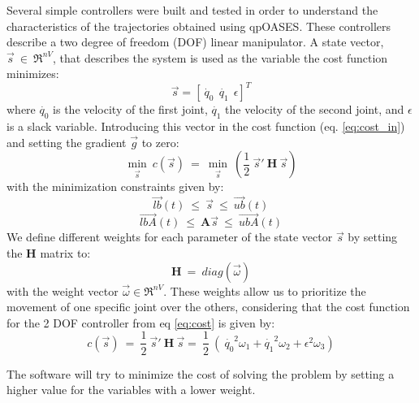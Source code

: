 Several simple controllers were built and tested in order to understand the characteristics of the trajectories obtained using qpOASES. These controllers describe a two degree of freedom (DOF) linear manipulator. A state vector, $\vec{s}\ \in\ \Re^{nV}$, that describes the system is used as the variable the cost function minimizes:
\begin{equation}
 \vec{s} = [\dot{\ q_{0}} \ \ \dot{q_{1}} \ \ \epsilon ]^{T}
 \label{eq:state}
\end{equation}
where $\dot{q_{0}}$ is the velocity of the first joint, $\dot{q_{1}}$ the velocity of the second joint, and $\epsilon$ is a slack variable. Introducing this vector in the cost function (eq. \ref{eq:cost_in}) and setting the gradient $\vec{g}$ to zero:
\begin{equation}
\underset{\vec{s}}{\min}\ c(\vec{s})\ =\  \underset{\vec{s}}{\min}\ \left( \frac{1}{2} \ \vec{s}' \ \textbf{H} \ \vec{s} \right)
\label{eq:cost}
\end{equation}
with the minimization constraints given by:
\begin{equation}
\vec{lb}(t)\ \leq\ \vec{s}\ \leq\ \vec{ub}(t)
\label{eq:constrain}
\end{equation}
\begin{equation}
\vec{lbA}(t)\ \leq\ \textbf{A} \vec{s}\ \leq\ \vec{ubA}(t)
\label{eq:constrainA}
\end{equation}
We define different weights for each parameter of the state vector $\vec{s}$ by setting the $\textbf{H}$ matrix to:
$$
\textbf{H}\ =\ diag(\vec{\omega})
$$
with the weight vector $\vec{\omega} \in \Re^{nV}$. These weights allow us to prioritize the movement of one specific joint over the others, considering that the cost function for the 2 DOF controller from eq \ref{eq:cost} is given by:
\begin{equation}
c(\vec{s})\ =\ \frac{1}{2} \ \vec{s}' \ \textbf{H} \ \vec{s} =\ \frac{1}{2} \ (\ \dot{q_{0}}^{2}\omega_{1} + \dot{q_{1}}^{2}\omega_{2} + \epsilon^{2}\omega_{3})
\end{equation}

The software will try to minimize the cost of solving the problem by setting a higher value for the variables with a lower weight.

